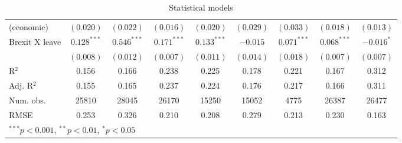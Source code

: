 \documentclass{article}
\begin{document}
\begin{table}
\begin{center}
{\begin{tabular}{l c c c c c c c c }
(economic)                                 & $(0.020)$      & $(0.022)$      & $(0.016)$      & $(0.020)$      & $(0.029)$      & $(0.033)$      & $(0.018)$      & $(0.013)$      \\
Brexit X leave                   & $0.128^{***}$  & $0.546^{***}$  & $0.171^{***}$  & $0.133^{***}$  & $-0.015$       & $0.071^{***}$  & $0.068^{***}$  & $-0.016^{*}$   \\
                                 & $(0.008)$      & $(0.012)$      & $(0.007)$      & $(0.011)$      & $(0.014)$      & $(0.018)$      & $(0.007)$      & $(0.007)$      \\
\hline
R$^2$                            & 0.156          & 0.166          & 0.238          & 0.225          & 0.178          & 0.221          & 0.167          & 0.312          \\
Adj. R$^2$                       & 0.155          & 0.165          & 0.237          & 0.224          & 0.176          & 0.217          & 0.166          & 0.311          \\
Num. obs.                        & 25810          & 28045          & 26170          & 15250          & 15052          & 4775           & 26387          & 26477          \\
RMSE                             & 0.253          & 0.326          & 0.210          & 0.208          & 0.279          & 0.213          & 0.230          & 0.163          \\
\hline
\multicolumn{9}{l}{\scriptsize{$^{***}p<0.001$, $^{**}p<0.01$, $^*p<0.05$}}
\end{tabular}}
\caption{Statistical models}
\label{table:coefficients}
\end{center}
\end{table}
\end{document}
